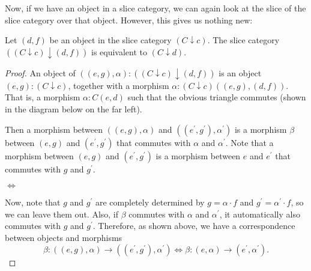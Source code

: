 Now, if we have an object in a slice category, we can again look at the slice of the slice category over that object. However, this gives us nothing new:
\begin{lemma}
  Let $ (d, f) $ be an object in the slice category $ (C \downarrow c) $. The slice category $ ((C \downarrow c) \downarrow (d, f)) $ is equivalent to $ (C \downarrow d) $.
\end{lemma}
\begin{proof}
  An object of $ ((e, g), \alpha) : ((C \downarrow c) \downarrow (d, f)) $ is an object $ (e, g) : (C \downarrow c) $, together with a morphism $ \alpha: (C \downarrow c)((e, g), (d, f)) $. That is, a morphism $ \alpha: C(e, d) $ such that the obvious triangle commutes (shown in the diagram below on the far left).

  Then a morphism between $ ((e, g), \alpha) $ and $ ((e^\prime, g^\prime), \alpha^\prime) $ is a morphism $ \beta $ between $ (e, g) $ and $ (e^\prime, g^\prime) $ that commutes with $ \alpha $ and $ \alpha^\prime $. Note that a morphism between $ (e, g) $ and $ (e^\prime, g^\prime) $ is a morphism between $ e $ and $ e^\prime $ that commutes with $ g $ and $ g^\prime $.
  \begin{center}
    $ \Leftrightarrow $
  \end{center}

  Now, note that $ g $ and $ g^\prime $ are completely determined by $ g = \alpha \cdot f $ and $ g^\prime = \alpha^\prime \cdot f $, so we can leave them out. Also, if $ \beta $ commutes with $ \alpha $ and $ \alpha^\prime $, it automatically also commutes with $ g $ and $ g^\prime $. Therefore, as shown above, we have a correspondence between objects and morphisms
  \[ \beta: ((e, g), \alpha) \to ((e^\prime, g^\prime), \alpha^\prime) \Leftrightarrow \beta: (e, \alpha) \to (e^\prime, \alpha^\prime). \]
\end{proof}

